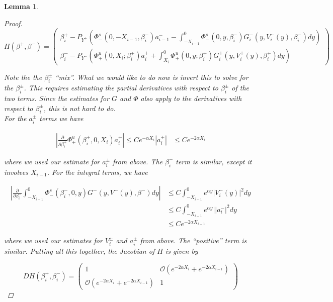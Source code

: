 \documentclass[12pt]{article}
\newtheorem{lemma}{Lemma}
\begin{document}
\begin{lemma}
\begin{proof}
\begin{equation}
H(\beta^+, \beta^-) = 
\begin{pmatrix}
\beta_i^+ - P_{Y^+}\left(\Phi^s_-(0, -X_{i-1}, \beta_i^-) a_{i-1}^- 
- \int_{-X_{i-1}}^0 \Phi_-^s(0, y, \beta_i^-) G_i^-(y, V_i^-(y),\beta_i^-) dy\right) \\
\beta_i^- - P_{Y^-}\left( \Phi^u_+(0, X_i; \beta_i^+) a_i^+ 
+ \int_{X_i}^0 \Phi_+^u(0, y; \beta_i^+) G_i^+(y, V_i^+(y),\beta_i^+)dy \right)
\end{pmatrix}
\end{equation}

Note the the $\beta_i^\pm$ ``mix''. What we would like to do now is invert this to solve for the $\beta_i^\pm$. This requires estimating the partial derivatives with respect to $\beta_i^\pm$ of the two terms. Since the estimates for $G$ and $\Phi$ also apply to the derivatives with respect to $\beta_i^\pm$, this is not hard to do.\\

For the $a_i^\pm$ terms we have

\begin{align*}
\left| \frac{\partial}{\partial \beta_i^+} \Phi^u_+(\beta_i^+, 0, X_i) a_i^+ \right| \leq C e^{-\alpha X_i}|a_i^+|
& \leq C e^{-2 \alpha X_i}
\end{align*}

where we used our estimate for $a_i^\pm$ from above. The $\beta_i^-$ term is similar, except it involves $X_{i-1}$. For the integral terms, we have

\begin{align*}
\left| \frac{\partial}{\partial \beta_i^-} \int_{-X_{i-1}}^0 \Phi_-^s(\beta_i^-, 0, y) G^-(y, V^-(y),\beta^-)dy \right| 
&\leq C \int_{-X_{i-1}}^0 e^{\alpha y} | V_i^-(y) |^2 dy \\
&\leq C \int_{-X_{i-1}}^0 e^{\alpha y} | |a_i^-|^2 dy \\
&\leq C e^{-2 \alpha X_{i-1}}
\end{align*}

where we used our estimates for $V_i^\pm$ and $a_i^\pm$ from above. The ``positive'' term is similar. Putting all this together, the Jacobian of $H$ is given by

\begin{equation}
D H(\beta_i^+, \beta_i^-) = 
\begin{pmatrix}
1 & \mathcal{O}(e^{-2 \alpha X_i} + e^{-2 \alpha X_{i-1}} ) \\
\mathcal{O}(e^{-2 \alpha X_i} + e^{-2 \alpha X_{i-1}} ) &  1 
\end{pmatrix}
\end{equation}


\end{proof}
\end{lemma}
\end{document}
